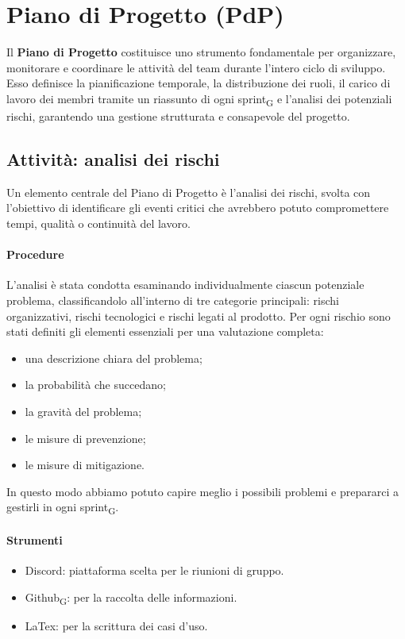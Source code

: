 \documentclass[11pt,a4paper]{article}
\newcommand{\gls}[1]{#1\textsubscript{G}}
\begin{document}
\newpage

\section{Piano di Progetto (PdP)}
Il \textbf{Piano di Progetto} costituisce uno strumento fondamentale per organizzare, monitorare e coordinare le attività del team durante l’intero ciclo di sviluppo. Esso definisce la pianificazione temporale, la distribuzione dei ruoli, il carico di lavoro dei membri tramite un riassunto di ogni \gls{sprint} e l’analisi dei potenziali rischi, garantendo una gestione strutturata e consapevole del progetto.

\subsection{Attività: analisi dei rischi}
Un elemento centrale del Piano di Progetto è l’analisi dei rischi, svolta con l’obiettivo di identificare gli eventi critici che avrebbero potuto compromettere tempi, qualità o continuità del lavoro.

\paragraph{Procedure}
L’analisi è stata condotta esaminando individualmente ciascun potenziale problema, classificandolo all’interno di tre categorie principali: rischi organizzativi, rischi tecnologici e rischi legati al prodotto.
Per ogni rischio sono stati definiti gli elementi essenziali per una valutazione completa:
\begin{itemize}
\item una descrizione chiara del problema;
\item la probabilità che succedano;
\item la gravità del problema;
\item le misure di prevenzione;
\item le misure di mitigazione.
\end{itemize}
In questo modo abbiamo potuto capire meglio i possibili problemi e prepararci a gestirli in ogni \gls{sprint}.

\paragraph{Strumenti}
\begin{itemize}
\item Discord: piattaforma scelta per le riunioni di gruppo.
\item \gls{Github}: per la raccolta delle informazioni.
\item LaTex: per la scrittura dei casi d'uso.
\end{itemize}
\end{document}
